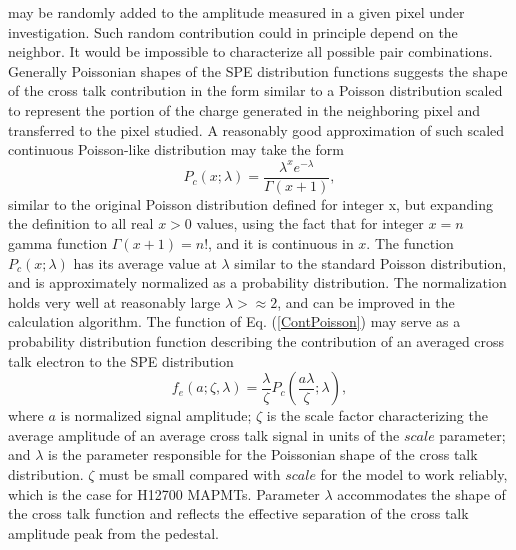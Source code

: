may be randomly added to the amplitude measured in a given pixel under investigation. Such random contribution could in principle depend on the neighbor. It would be impossible to characterize all possible pair combinations. Generally Poissonian shapes of the SPE distribution functions suggests the shape of the cross talk contribution in the form similar to a Poisson distribution scaled to represent the portion of the charge generated in the neighboring pixel and transferred to the pixel studied. A reasonably good approximation of such scaled continuous Poisson-like distribution may take the form 
\begin{equation}
\label{ContPoisson}
 P_c(x;\lambda) = \frac{\lambda^{x} e^{-\lambda}}{\Gamma(x+1)},
\end{equation}
similar to the original Poisson distribution defined for integer x, but expanding the definition to all real $x>0$ values, using the fact that for integer $x = n$ gamma function $\Gamma(x+1) = n!$, and it is continuous in $x$. The function $ P_c(x;\lambda) $ has its average value at $\lambda$ similar to the standard Poisson distribution, and is approximately normalized as a probability distribution. The normalization holds very well at reasonably large $\lambda > \approx 2$, and can be improved in the calculation algorithm. The function of Eq. (\ref{ContPoisson}) may serve as a probability distribution function describing the contribution of an averaged cross talk electron to the SPE distribution
\begin{equation}
\label{fe}
 f_{e}(a;\zeta,\lambda) = \frac{\lambda}{\zeta} P_c \left (\frac{a \lambda}{\zeta};\lambda \right ),
\end{equation}
where $a$ is normalized signal amplitude; $\zeta$ is the scale factor characterizing the average amplitude of an average cross talk signal in units of the $scale$ parameter; and $\lambda$ is the parameter responsible for the Poissonian shape of the cross talk distribution. $\zeta$ must be small compared with $scale$ for the model to work reliably, which is the case for H12700 MAPMTs. Parameter $\lambda$ accommodates the shape of the cross talk function and reflects the effective separation of the cross talk amplitude peak from the pedestal.

